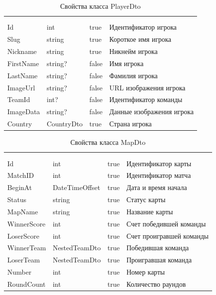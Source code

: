 \begin{xltabular}{\textwidth}{|X|X|X|X|}
	\caption{Свойства класса PlayerDto}\label{table:PlayerDto}\\ \hline
	 &  &  &  \\ \hline
	 &  &  &  \\ \hline
	\endfirsthead
	 \hline
	 &  &  &  \\ \hline
	\endhead
	Id & int & true & Идентификатор игрока \\ \hline
	Slug & string & true & Короткое имя игрока \\ \hline
	Nickname & string & true & Никнейм игрока \\ \hline
	FirstName & string? & false & Имя игрока \\ \hline
	LastName & string? & false & Фамилия игрока \\ \hline
	ImageUrl & string? & false & URL изображения игрока \\ \hline
	TeamId & int? & false & Идентификатор команды \\ \hline
	ImageData & string? & false & Данные изображения игрока \\ \hline
	Country & CountryDto & true & Страна игрока \\ \hline
\end{xltabular}

\begin{xltabular}{\textwidth}{|X|X|X|X|}
	\caption{Свойства класса MapDto}\label{table:MapDto}\\ \hline
	 &  &  &  \\ \hline
	 &  &  &  \\ \hline
	\endfirsthead
	 \hline
	 &  &  &  \\ \hline
	\endhead
	Id & int & true & Идентификатор карты \\ \hline
	MatchID & int & true & Идентификатор матча \\ \hline
	BeginAt & DateTimeOffset & true & Дата и время начала \\ \hline
	Status & string & true & Статус карты \\ \hline
	MapName & string & true & Название карты \\ \hline
	WinnerScore & int & true & Счет победившей команды \\ \hline
	LoserScore & int & true & Счет проигравшей команды \\ \hline
	WinnerTeam & NestedTeamDto & true & Победившая команда \\ \hline
	LoserTeam & NestedTeamDto & true & Проигравшая команда \\ \hline
	Number & int & true & Номер карты \\ \hline
	RoundCount & int & true & Количество раундов \\ \hline
\end{xltabular}

